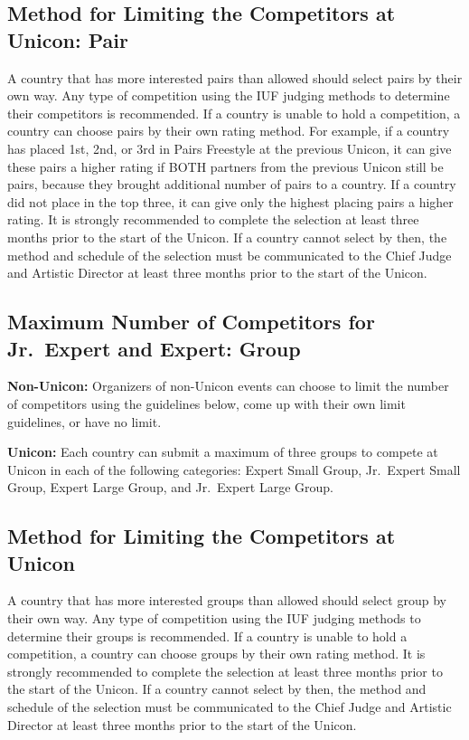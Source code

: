 \subsection{Method for Limiting the Competitors at Unicon: Pair}
A country that has more interested pairs than allowed should select pairs by their own way.
Any type of competition using the IUF judging methods to determine their competitors is recommended.
If a country is unable to hold a competition, a country can choose pairs by their own rating method.
For example, if a country has placed 1st, 2nd, or 3rd in Pairs Freestyle at the previous Unicon, it can give these pairs a higher rating if BOTH partners from the previous Unicon still be pairs, because they brought additional number of pairs to a country.
If a country did not place in the top three, it can give only the highest placing pairs a higher rating.
It is strongly recommended to complete the selection at least three months prior to the start of the Unicon.
If a country cannot select by then, the method and schedule of the selection must be communicated to the Chief Judge and Artistic Director at least three months prior to the start of the Unicon.

\subsection{Maximum Number of Competitors for Jr.~Expert and Expert: Group}
\textbf{Non-Unicon:} Organizers of non-Unicon events can choose to limit the number of competitors using the guidelines below, come up with their own limit guidelines, or have no limit.

\textbf{Unicon:} Each country can submit a maximum of three groups to compete at Unicon in each of the following categories: Expert Small Group, Jr.~Expert Small Group, Expert Large Group, and Jr.~Expert Large Group.

\subsection{Method for Limiting the Competitors at Unicon}
A country that has more interested groups than allowed should select group by their own way.
Any type of competition using the IUF judging methods to determine their groups is recommended.
If a country is unable to hold a competition, a country can choose groups by their own rating method.
It is strongly recommended to complete the selection at least three months prior to the start of the Unicon.
If a country cannot select by then, the method and schedule of the selection must be communicated to the Chief Judge and Artistic Director at least three months prior to the start of the Unicon.
